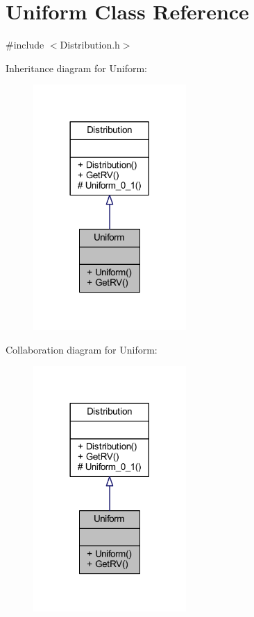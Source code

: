 \hypertarget{class_uniform}{}\section{Uniform Class Reference}
\label{class_uniform}


{\ttfamily \#include $<$Distribution.\+h$>$}



Inheritance diagram for Uniform\+:
\nopagebreak
\begin{figure}[H]
\begin{center}
\leavevmode
\includegraphics[width=165pt]{class_uniform__inherit__graph}
\end{center}
\end{figure}


Collaboration diagram for Uniform\+:
\nopagebreak
\begin{figure}[H]
\begin{center}
\leavevmode
\includegraphics[width=165pt]{class_uniform__coll__graph}
\end{center}
\end{figure}

